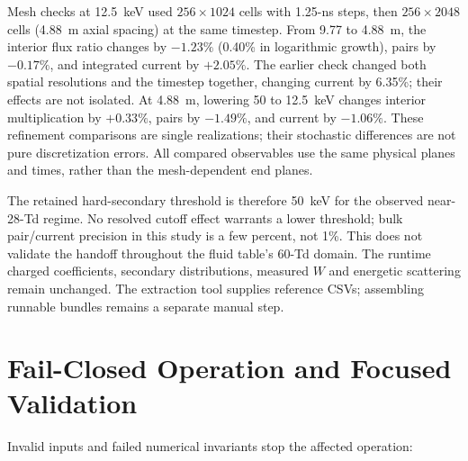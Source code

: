 \documentclass[11pt]{article}
\begin{document}
Mesh checks at 12.5~keV used $256\times1024$ cells with 1.25-ns steps,
then $256\times2048$ cells (4.88~m axial spacing) at the same timestep.
From 9.77 to 4.88~m, the interior flux ratio changes by $-1.23\%$
(0.40\% in logarithmic growth), pairs by $-0.17\%$, and integrated current
by $+2.05\%$. The earlier check changed both spatial resolutions and the
timestep together, changing current by 6.35\%; their effects are not isolated.
At 4.88~m, lowering 50 to 12.5~keV changes interior multiplication
by $+0.33\%$, pairs by $-1.49\%$, and current by $-1.06\%$. These refinement
comparisons are single realizations; their stochastic differences are not
pure discretization errors. All compared observables use the same physical
planes and times, rather than the mesh-dependent end planes.

The retained hard-secondary threshold is therefore 50~keV for the observed
near-28-Td regime. No resolved cutoff effect warrants a lower threshold;
bulk pair/current precision in this study is a few percent, not 1\%.
This does not validate the handoff throughout the fluid table's 60-Td
domain. The runtime charged coefficients, secondary distributions, measured
$W$ and energetic scattering remain unchanged. The extraction tool supplies
reference CSVs; assembling runnable bundles remains a separate manual step.

\section{Fail-Closed Operation and Focused Validation}
\label{sec:failclosed}

Invalid inputs and failed numerical invariants stop the affected operation:
\end{document}
